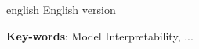 
\begin{resumo}[Abstract]
    \begin{otherlanguage*}{english}
    English version
    
    \vspace{\onelineskip}
    
    \noindent 
    \textbf{Key-words}: Model Interpretability, ...
    \end{otherlanguage*}

\end{resumo}
